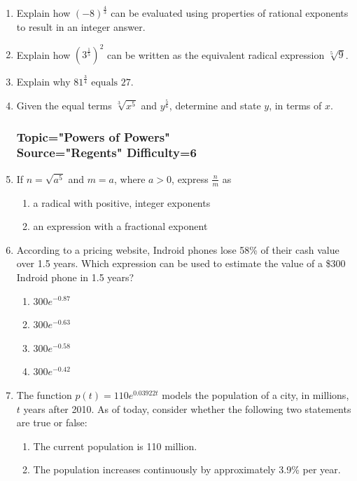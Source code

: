 \documentclass[12pt, oneside]{article}
\begin{document}
\begin{enumerate}
\item Explain how $\displaystyle (-8)^\frac{4}{3}$ can be evaluated using properties of rational exponents to result in an integer answer.

\item Explain how $\displaystyle \left(3^{\frac{1}{5}} \right)^2$ can be written as the equivalent radical expression $\sqrt[5]9$. %

\item Explain why $81^\frac{3}{4} \text{ equals } 27$.

\item Given the equal terms $\displaystyle \sqrt[3]{x^5}$ and $\displaystyle y^{\frac{5}{6}}$, determine and state $y$, in terms of $x$. %

\newpage
\subsubsection*{Topic="Powers of Powers"\\
Source="Regents" 
Difficulty=6}

\item If $n=\sqrt{a^5}$ and $m=a$, where $a > 0$, express $\frac{n}{m}$ as 
\begin{enumerate}
    \item a radical with positive, integer exponents
    \item an expression with a fractional exponent
\end{enumerate}

\item According to a pricing website, Indroid phones lose 58\% of their cash value over 1.5 years. Which expression can be used to estimate the value of a \$300 Indroid phone in 1.5 years?
\begin{enumerate}
    \item $300e^{-0.87}$
    \item $300e^{-0.63}$
    \item $300e^{-0.58}$
    \item $300e^{-0.42}$
\end{enumerate} %


\item The function $p(t)=110e^{0.03922t}$ models the population of a city, in millions, $t$ years after 2010. As of today, consider whether the following two statements are true or false:
\begin{enumerate}
    \item The current population is 110 million.
    \item The population increases continuously by approximately 3.9\% per year.
\end{enumerate} %


\end{enumerate}
\end{document}
